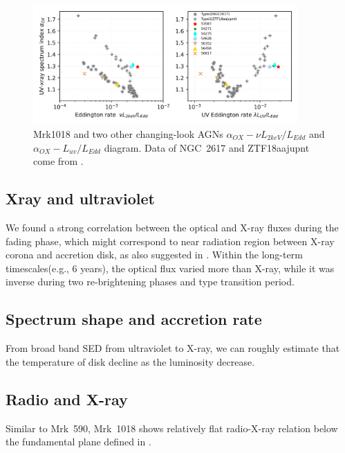 \documentclass{aastex63}
\begin{document}
\begin{figure}
\centering
	\includegraphics[width=0.9\textwidth]{./pic/Mrk1018_subplots_plus_2individuals_alpha_ox_L_x_Luv_rate.png}
    \caption{Mrk1018 and two other changing-look AGNs $\alpha_{OX}-\nu L_{2keV}/L_{Edd}$ and $\alpha_{OX}-L_{uv}/L_{Edd}$ diagram. Data of NGC~2617 and ZTF18aajupnt come from \citet{2019arXiv190904676R}.  }
    \label{fig:alpha_ox_luv}
\end{figure}


\subsection{Xray and ultraviolet }
We found a strong correlation between the optical and X-ray fluxes during the fading phase, which might correspond to near radiation region  between X-ray corona and accretion disk, as also suggested in \citet{2017A&A...607L...9K}. Within the long-term timescales(e.g., 6 years), the optical flux varied more than X-ray, while it was inverse during two re-brightening phases and type transition period.



\subsection{Spectrum shape and accretion rate}
From broad band SED from ultraviolet to X-ray, we can roughly estimate that the temperature of disk decline as the luminosity decrease.



\subsection{Radio and X-ray}
Similar to Mrk~590, Mrk~1018 shows relatively flat radio-X-ray relation below the fundamental plane defined in \citet{2003MNRAS.345.1057M}.
\end{document}
